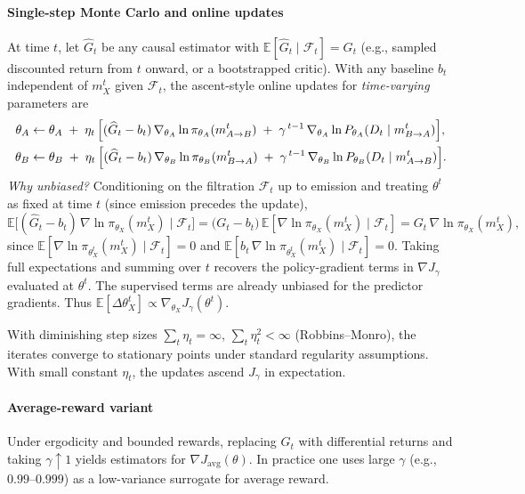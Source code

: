 \documentclass{article}
\begin{document}
\paragraph{Single-step Monte Carlo and online updates}
At time $t$, let $\widehat G_t$ be any causal estimator with $\mathbb{E}[\widehat G_t\mid\mathcal{F}_t]=G_t$ (e.g., sampled discounted return from $t$ onward, or a bootstrapped critic). With any baseline $b_t$ independent of $m_{X}^t$ given $\mathcal{F}_t$, the ascent-style online updates for \emph{time-varying} parameters are
\begin{align*}
\theta_A &\leftarrow \theta_A 
\; + \; \eta_t\, \Bigl[ (\widehat G_t - b_t)\, \nabla_{\theta_A}\ln\pi_{\theta_A}(m_{A\to B}^{t}) 
\; + \; \gamma^{\,t-1}\, \nabla_{\theta_A}\ln P_{\theta_A}(D_t\mid m_{B\to A}^{t}) \Bigr],\\
\theta_B &\leftarrow \theta_B 
\; + \; \eta_t\, \Bigl[ (\widehat G_t - b_t)\, \nabla_{\theta_B}\ln\pi_{\theta_B}(m_{B\to A}^{t}) 
\; + \; \gamma^{\,t-1}\, \nabla_{\theta_B}\ln P_{\theta_B}(D_t\mid m_{A\to B}^{t}) \Bigr].
\end{align*}
\emph{Why unbiased?} Conditioning on the filtration $\mathcal{F}_t$ up to emission and treating $\theta^t$ as fixed at time $t$ (since emission precedes the update),
\[
\mathbb{E}\bigl[(\widehat G_t-b_t)\,\nabla\ln\pi_{\theta_X}(m_{X}^t)\mid\mathcal{F}_t\bigr]
= \bigl(G_t-b_t\bigr)\, \mathbb{E}[\nabla\ln\pi_{\theta_X}(m_{X}^t)\mid\mathcal{F}_t]
= G_t\, \nabla\ln\pi_{\theta_X}(m_{X}^t),
\]
since $\mathbb{E}[\nabla\ln\pi_{\theta_X^t}(m_{X}^t)\mid\mathcal{F}_t]=0$ and $\mathbb{E}[b_t\,\nabla\ln\pi_{\theta_X^t}(m_{X}^t)\mid\mathcal{F}_t]=0$. Taking full expectations and summing over $t$ recovers the policy-gradient terms in $\nabla J_{\gamma}$ evaluated at $\theta^t$. The supervised terms are already unbiased for the predictor gradients. Thus $\mathbb{E}[\Delta\theta_X^{t}]\propto \nabla_{\theta_X} J_{\gamma}(\theta^t)$.

With diminishing step sizes $\sum_t \eta_t=\infty$, $\sum_t \eta_t^2<\infty$ (Robbins–Monro), the iterates converge to stationary points under standard regularity assumptions. With small constant $\eta_t$, the updates ascend $J_{\gamma}$ in expectation.

\paragraph{Average-reward variant} Under ergodicity and bounded rewards, replacing $G_t$ with differential returns and taking $\gamma\uparrow 1$ yields estimators for $\nabla J_{\mathrm{avg}}(\theta)$. In practice one uses large $\gamma$ (e.g., $0.99$–$0.999$) as a low-variance surrogate for average reward.
\end{document}
